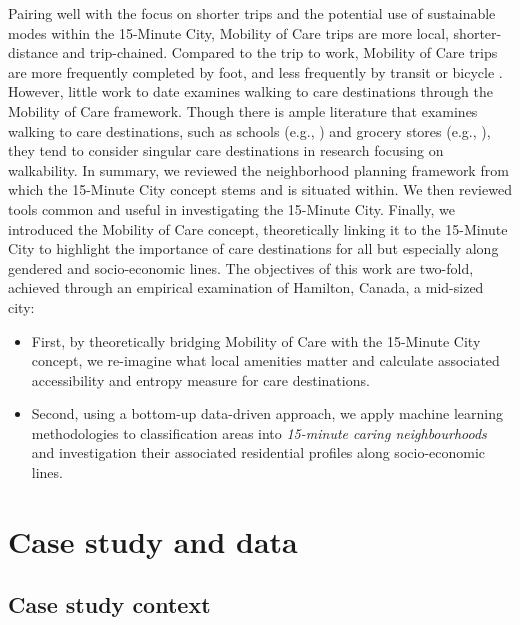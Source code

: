 \documentclass[
  authoryear,
  preprint,
  3p]{elsarticle}
\providecommand{\tightlist}{%
  \setlength{\itemsep}{0pt}\setlength{\parskip}{0pt}}\usepackage{longtable,booktabs,array}
\def\tightlist{}
\begin{document}
Pairing well with the focus on shorter trips and the potential use of
sustainable modes within the 15-Minute City, Mobility of Care trips are
more local, shorter-distance and trip-chained. Compared to the trip to
work, Mobility of Care trips are more frequently completed by foot, and
less frequently by transit or bicycle
\citep{ravensbergen2023exploratory}. However, little work to date
examines walking to care destinations through the Mobility of Care
framework. Though there is ample literature that examines walking to
care destinations, such as schools (e.g., \citep{RN7, RN8, RN9}) and
grocery stores (e.g., \citep{RN10, RN11}), they tend to consider
singular care destinations in research focusing on walkability. In
summary, we reviewed the neighborhood planning framework from which the
15-Minute City concept stems and is situated within. We then reviewed
tools common and useful in investigating the 15-Minute City. Finally, we
introduced the Mobility of Care concept, theoretically linking it to the
15-Minute City to highlight the importance of care destinations for all
but especially along gendered and socio-economic lines. The objectives
of this work are two-fold, achieved through an empirical examination of
Hamilton, Canada, a mid-sized city:

\begin{itemize}
\tightlist
\item
  First, by theoretically bridging Mobility of Care with the 15-Minute
  City concept, we re-imagine what local amenities matter and calculate
  associated accessibility and entropy measure for care destinations.
\item
  Second, using a bottom-up data-driven approach, we apply machine
  learning methodologies to classification areas into \emph{15-minute
  caring neighbourhoods} and investigation their associated residential
  profiles along socio-economic lines.
\end{itemize}

\section{Case study and data}\label{case-study-and-data}

\subsection{Case study context}\label{case-study-context}
\end{document}
